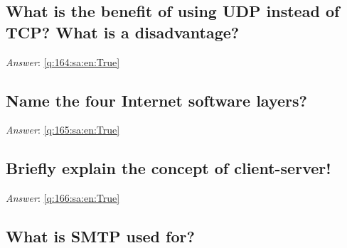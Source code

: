 \documentclass[a4paper,11pt,oneside]{article}
\begin{document}
\begin{sloppypar}
\subsection{What is the benefit of using UDP instead of TCP? What is a disadvantage?}

\label{q:164:sa:en:False}

\vspace{2cm}

\noindent\makebox[\textwidth]{\hrulefill}

\vspace{1cm}

\textit{Answer}: \autoref{q:164:sa:en:True}



\subsection{Name the four Internet software layers?}

\label{q:165:sa:en:False}

\vspace{2cm}

\noindent\makebox[\textwidth]{\hrulefill}

\vspace{1cm}

\textit{Answer}: \autoref{q:165:sa:en:True}



\subsection{Briefly explain the concept of client-server!}

\label{q:166:sa:en:False}

\vspace{2cm}

\noindent\makebox[\textwidth]{\hrulefill}

\vspace{1cm}

\textit{Answer}: \autoref{q:166:sa:en:True}



\subsection{What is SMTP used for?}

\label{q:167:sa:en:False}

\vspace{2cm}

\noindent\makebox[\textwidth]{\hrulefill}


\end{sloppypar}
\end{document}
